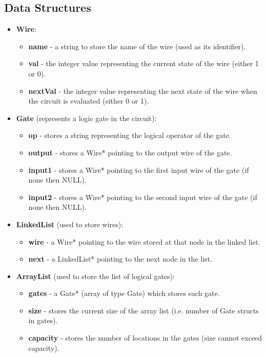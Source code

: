 \documentclass[11]{article}
\begin{document}
		\subsection{Data Structures}
			\begin{itemize}
				\item \textbf{Wire}:
					\begin{itemize}
						\item \textbf{name} - a string to store the name of the wire (used as its identifier).
						\item \textbf{val} - the integer value representing the current state of the wire (either 1 or 0).
						\item \textbf{nextVal} - the integer value representing the next state of the wire when the circuit is evaluated (either 0 or 1).
					\end{itemize}
					
				\item \textbf{Gate} (represents a logic gate in the circuit):
					\begin{itemize}
						\item \textbf{op} - stores a string representing the logical operator of the gate.
						\item \textbf{output} - stores a Wire* pointing to the output wire of the gate.
						\item \textbf{input1} - stores a Wire* pointing to the first input wire of the gate (if none then NULL).
						\item \textbf{input2} - stores a Wire* pointing to the second input wire of the gate (if none then NULL).
					\end{itemize}						
				\item \textbf{LinkedList} (used to store wires):
					\begin{itemize}
						\item \textbf{wire} - a Wire* pointing to the wire stored at that node in the linked list.
						\item \textbf{next} - a LinkedList* pointing to the next node in the list.
					\end{itemize}
				\item \textbf{ArrayList} (used to store the list of logical gates):
					\begin{itemize}
						\item \textbf{gates} - a Gate* (array of type Gate) which stores each gate.
						\item \textbf{size} - stores the current size of the array list (i.e. number of Gate structs in gates).
						\item \textbf{capacity} - stores the number of locations in the gates (size cannot exceed capacity).
					\end{itemize}
			\end{itemize}
\end{document}

